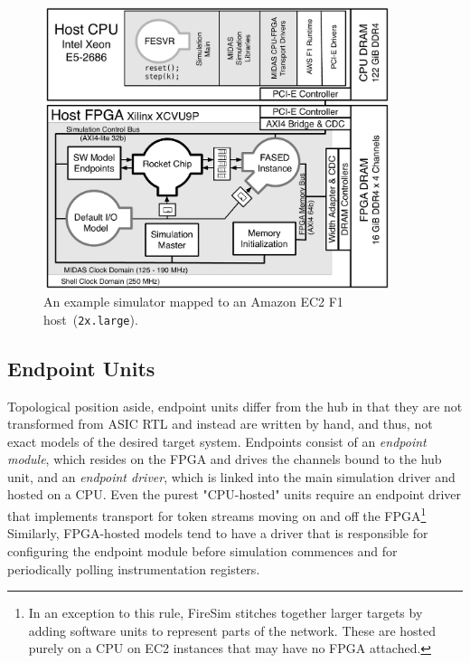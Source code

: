 \begin{figure}
    \centering
    \includegraphics[width=0.9\textwidth]{figures/mapped-simulator-f1.pdf}
    \caption{An example simulator mapped to an Amazon EC2 F1 host~(\texttt{2x.large}).}
    \label{fig:mapped-simulator-f1}
\end{figure}


\subsection{Endpoint Units}\label{sec:midas-endpoints}

Topological position aside, endpoint units differ from the hub in that they are not transformed from ASIC
RTL and instead are written by hand, and thus, not exact models of the desired target system.
Endpoints consist of an \emph{endpoint module}, which resides on the FPGA and drives the channels bound to the hub unit, and an
\emph{endpoint driver}, which is linked into the main simulation driver and hosted on a CPU.
Even the purest "CPU-hosted" units require an endpoint driver that
implements transport for token streams moving on and off the
FPGA\footnote{In an exception to this rule, FireSim stitches together larger targets by adding software units
to represent parts of the network. These are hosted purely on a CPU on EC2 instances that may have no FPGA attached.}
Similarly, FPGA-hosted models tend to have a driver
that is responsible for configuring the endpoint module before simulation commences and for periodically polling
instrumentation registers.

